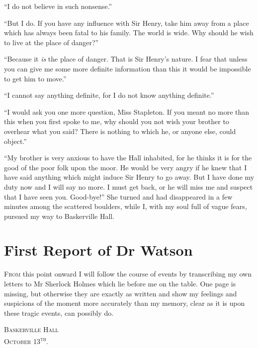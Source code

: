 \documentclass[paper=5.5in:8.5in,BCOR=7mm,twoside,DIV=calc,12pt,usegeometry,openany,chapterprefix,endperiod]{scrbook} %
\begin{document}

\enquote{I do not believe in such nonsense.}

\enquote{But I do. If you have any influence with Sir Henry, take him away from a place which has always been fatal to his family. The world is wide. Why should he wish to live at the place of danger?}

\enquote{Because it \textit{is} the place of danger. That is Sir Henry's nature. I fear that unless you can give me some more definite information than this it would be impossible to get him to move.}

\enquote{I cannot say anything definite, for I do not know anything definite.}

\enquote{I would ask you one more question, Miss Stapleton. If you meant no more than this when you first spoke to me, why should you not wish your brother to overhear what you said? There is nothing to which he, or anyone else, could object.}

\enquote{My brother is very anxious to have the Hall inhabited, for he thinks it is for the good of the poor folk upon the moor. He would be very angry if he knew that I have said anything which might induce Sir Henry to go away. But I have done my duty now and I will say no more. I must get back, or he will miss me and suspect that I have seen you. Good-bye!} She turned and had disappeared in a few minutes among the scattered boulders, while I, with my soul full of vague fears, pursued my way to Baskerville Hall.

\chapter{First Report of Dr Watson}
\lettrine[lines=1]{F}{rom} this point onward I will follow the course of events by transcribing my own letters to Mr Sherlock Holmes which lie before me on the table. One page is missing, but otherwise they are exactly as written and show my feelings and suspicions of the moment more accurately than my memory, clear as it is upon these tragic events, can possibly do.\\

\hfill\begin{minipage}{0.5\linewidth}\textsc{Baskerville Hall\\October 13\textsuperscript{th}.}\end{minipage}
\end{document}
